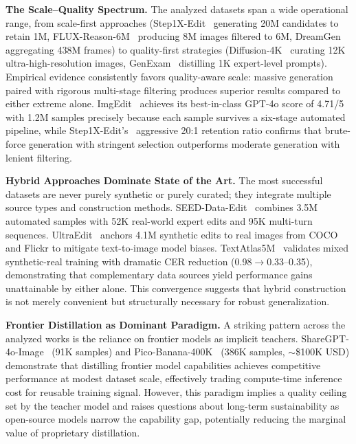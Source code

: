 \documentclass{llmxive}
\begin{document}
\textbf{The Scale--Quality Spectrum.}
The analyzed datasets span a wide operational range, from scale-first approaches (Step1X-Edit~\citep{liu2025step1x} generating 20M candidates to retain 1M, FLUX-Reason-6M~\citep{fang2025flux} producing 8M images filtered to 6M, DreamGen~\citep{jang2025dreamgen} aggregating 438M frames) to quality-first strategies (Diffusion-4K~\citep{zhang2025diffusion} curating 12K ultra-high-resolution images, GenExam~\citep{wang2025genexam} distilling 1K expert-level prompts). Empirical evidence consistently favors quality-aware scale: massive generation paired with rigorous multi-stage filtering produces superior results compared to either extreme alone. ImgEdit~\citep{ye2025imgedit} achieves its best-in-class GPT-4o score of 4.71/5 with 1.2M samples precisely because each sample survives a six-stage automated pipeline, while Step1X-Edit's~\citep{liu2025step1x} aggressive 20:1 retention ratio confirms that brute-force generation with stringent selection outperforms moderate generation with lenient filtering.

\textbf{Hybrid Approaches Dominate State of the Art.}
The most successful datasets are never purely synthetic or purely curated; they integrate multiple source types and construction methods. SEED-Data-Edit~\citep{ge2024seed} combines 3.5M automated samples with 52K real-world expert edits and 95K multi-turn sequences. UltraEdit~\citep{zhao2024ultraedit} anchors 4.1M synthetic edits to real images from COCO and Flickr to mitigate text-to-image model biases. TextAtlas5M~\citep{wang2025textatlas5m} validates mixed synthetic-real training with dramatic CER reduction (0.98$\rightarrow$0.33--0.35), demonstrating that complementary data sources yield performance gains unattainable by either alone. This convergence suggests that hybrid construction is not merely convenient but structurally necessary for robust generalization.

\textbf{Frontier Distillation as Dominant Paradigm.}
A striking pattern across the analyzed works is the reliance on frontier models as implicit teachers. ShareGPT-4o-Image~\citep{chen2025sharegpt} (91K samples) and Pico-Banana-400K~\citep{qian2025pico} (386K samples, $\sim$\$100K USD) demonstrate that distilling frontier model capabilities achieves competitive performance at modest dataset scale, effectively trading compute-time inference cost for reusable training signal. However, this paradigm implies a quality ceiling set by the teacher model and raises questions about long-term sustainability as open-source models narrow the capability gap, potentially reducing the marginal value of proprietary distillation.
\end{document}
